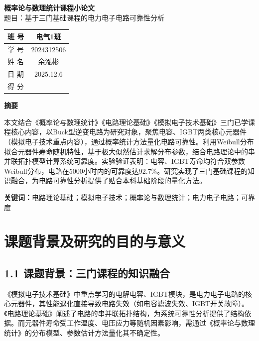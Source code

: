 \documentclass{article}
\begin{document}
\thispagestyle{empty}
\vspace*{8em}
{\centering{}
    \textbf{概率论与数理统计课程小论文} \\
    \vspace*{1em}
    {\heiti 题目：}{\heiti 基于三门基础课程的电力电子电路可靠性分析} \\
}
\vspace*{8em}
\begin{center}
    \renewcommand{\arraystretch}{1.5}
    {\bfseries{}
        \begin{tabular}{|>{\centering\arraybackslash}m{3cm}|c|}
            \hline
            班 \quad 号  & 电气1班   \\
            \hline
            学 \quad 号 & 2024312506 \\
            \hline
            姓 \quad 名 & 余泓彬        \\
            \hline
            日 \quad 期 & 2025.12.6 \\
            \hline
            得 \quad 分 &            \\
            \hline
        \end{tabular}
    }
\end{center}
\newpage

\begin{center}
    \bfseries{}\heiti 摘\quad 要
\end{center}
本文结合《概率论与数理统计》《电路理论基础》《模拟电子技术基础》三门已学课程核心内容，以Buck型逆变电路为研究对象，聚焦电容、IGBT两类核心元器件（模拟电子技术重点内容），通过概率统计方法量化电路可靠性。利用Weibull分布拟合元器件寿命随机特性，基于极大似然估计求解分布参数，结合电路理论中的串并联拓扑模型计算系统可靠度。实验验证表明：电容、IGBT寿命均符合双参数Weibull分布，电路在5000小时内的可靠度达92.7\%。研究实现了三门基础课程的知识融合，为电路可靠性分析提供了贴合本科基础阶段的量化方法。

\vspace{1em}
\noindent\textbf{关键词：}电路理论基础；模拟电子技术；概率论与数理统计；电力电子电路；可靠度


\newpage

\section*{课题背景及研究的目的与意义}
\subsection*{1.1 课题背景：三门课程的知识融合}
《模拟电子技术基础》中重点学习的电解电容、IGBT模块，是电力电子电路的核心元器件，其性能退化直接导致电路失效（如电容滤波失效、IGBT开关故障）。《电路理论基础》阐述了电路的串并联拓扑结构，为系统可靠性分析提供了结构依据。而元器件寿命受工作温度、电压应力等随机因素影响，需通过《概率论与数理统计》的分布模型、参数估计方法量化其不确定性。
\end{document}
